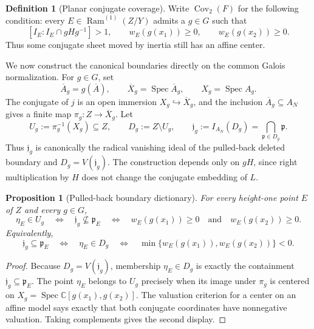 \documentclass[11pt]{article}
\newtheorem{proposition}[theorem]{Proposition}
\theoremstyle{remark}
\theoremstyle{definition}
\newtheorem{definition}[theorem]{Definition}
\DeclareMathOperator{\Spec}{Spec}
\DeclareMathOperator{\Ram}{Ram}
\newcommand{\C}{\mathbb C}
\begin{document}
\begin{definition}[Planar conjugate coverage]
\label{def:planar-conjugate-coverage}
Write \(\operatorname{Cov}_2(F)\) for the following condition: every
\(E\in\Ram^{(1)}(Z/Y)\) admits a \(g\in G\) such that
\[
  [I_E:I_E\cap gHg^{-1}]>1,
  \qquad
  w_E(g(x_1))\geq0,
  \qquad
  w_E(g(x_2))\geq0.
\]
Thus some conjugate sheet moved by inertia still has an affine center.
\end{definition}

We now construct the canonical boundaries directly on the common Galois
normalization.  For \(g\in G\), set
\[
  \overline A_g=g(\overline A),
  \qquad
  \overline X_g=\Spec\overline A_g,
  \qquad
  X_g=\Spec A_g.
\]
The conjugate of \(j\) is an open immersion
\(X_g\hookrightarrow\overline X_g\), and the inclusion
\(\overline A_g\subseteq A_N\) gives a finite map
\(\pi_g\colon Z\to\overline X_g\).  Let
\[
  U_g:=\pi_g^{-1}(X_g)\subseteq Z,
  \qquad
  D_g:=Z\setminus U_g,
  \qquad
  \mathfrak j_g:=
    I_{A_N}(D_g)
    =
    \bigcap_{\mathfrak p\in D_g}\mathfrak p.
\]
Thus \(\mathfrak j_g\) is canonically the radical vanishing ideal of the
pulled-back deleted boundary and \(D_g=V(\mathfrak j_g)\).  The
construction depends only on \(gH\), since right multiplication by \(H\)
does not change the conjugate embedding of \(L\).

\begin{proposition}[Pulled-back boundary dictionary]
\label{prop:pulled-back-boundary-dictionary}
For every height-one point \(E\) of \(Z\) and every \(g\in G\),
\[
  \eta_E\in U_g
  \quad\Longleftrightarrow\quad
  \mathfrak j_g\nsubseteq\mathfrak p_E
  \quad\Longleftrightarrow\quad
  w_E(g(x_1))\geq0
  \quad\text{and}\quad
  w_E(g(x_2))\geq0.
\]
Equivalently,
\[
  \mathfrak j_g\subseteq\mathfrak p_E
  \quad\Longleftrightarrow\quad
  \eta_E\in D_g
  \quad\Longleftrightarrow\quad
  \min\{w_E(g(x_1)),w_E(g(x_2))\}<0.
\]
\end{proposition}

\begin{proof}
Because \(D_g=V(\mathfrak j_g)\), membership
\(\eta_E\in D_g\) is exactly the containment
\(\mathfrak j_g\subseteq\mathfrak p_E\).  The point
\(\eta_E\) belongs to \(U_g\) precisely when its image under
\(\pi_g\) is centered on \(X_g=\Spec\C[g(x_1),g(x_2)]\).  The valuation
criterion for a center on an affine model says exactly that both conjugate
coordinates have nonnegative valuation.  Taking complements gives the
second display.
\end{proof}
\end{document}
